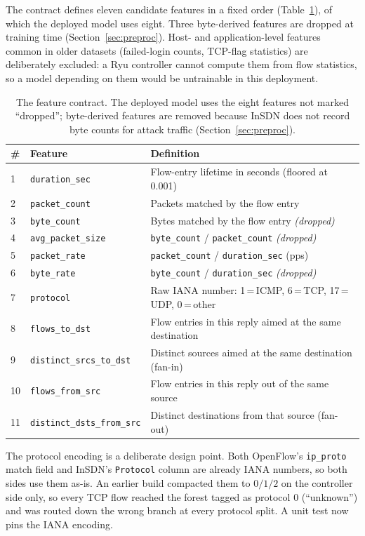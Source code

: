 \documentclass[11pt]{article}
\begin{document}
The contract defines eleven candidate features in a fixed order
(Table~\ref{tab:featurelist}), of which the deployed model uses eight. Three byte-derived
features are dropped at training time (Section~\ref{sec:preproc}). Host- and
application-level features common in older datasets (failed-login counts, TCP-flag
statistics) are deliberately excluded: a Ryu controller cannot compute them from flow
statistics, so a model depending on them would be untrainable in this deployment.

\begin{table}[h]
\centering
\caption{The feature contract. The deployed model uses the eight features not marked
``dropped''; byte-derived features are removed because InSDN does not record byte counts
for attack traffic (Section~\ref{sec:preproc}).}
\label{tab:featurelist}
\begin{tabular}{llp{6.6cm}}
\toprule
\# & Feature & Definition \\
\midrule
1 & \texttt{duration\_sec} & Flow-entry lifetime in seconds (floored at 0.001) \\
2 & \texttt{packet\_count} & Packets matched by the flow entry \\
3 & \texttt{byte\_count} & Bytes matched by the flow entry \emph{(dropped)} \\
4 & \texttt{avg\_packet\_size} & \texttt{byte\_count} / \texttt{packet\_count}
\emph{(dropped)} \\
5 & \texttt{packet\_rate} & \texttt{packet\_count} / \texttt{duration\_sec} (pps) \\
6 & \texttt{byte\_rate} & \texttt{byte\_count} / \texttt{duration\_sec} \emph{(dropped)} \\
7 & \texttt{protocol} & Raw IANA number: 1\,=\,ICMP, 6\,=\,TCP, 17\,=\,UDP, 0\,=\,other \\
8 & \texttt{flows\_to\_dst} & Flow entries in this reply aimed at the same destination \\
9 & \texttt{distinct\_srcs\_to\_dst} & Distinct sources aimed at the same destination
(fan-in) \\
10 & \texttt{flows\_from\_src} & Flow entries in this reply out of the same source \\
11 & \texttt{distinct\_dsts\_from\_src} & Distinct destinations from that source (fan-out) \\
\bottomrule
\end{tabular}
\end{table}

The protocol encoding is a deliberate design point. Both OpenFlow's \texttt{ip\_proto}
match field and InSDN's \texttt{Protocol} column are already IANA numbers, so both sides
use them as-is. An earlier build compacted them to $0/1/2$ on the controller side only,
so every TCP flow reached the forest tagged as protocol $0$ (``unknown'') and was routed
down the wrong branch at every protocol split. A unit test now pins the IANA encoding.
\end{document}

